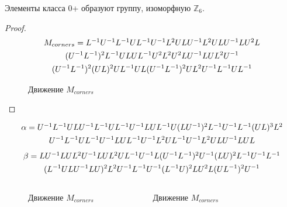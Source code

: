 \documentclass{beamer}
\begin{document}
\begin{frame}
	\begin{theorem}
		Элементы класса 0+ образуют группу, изоморфную $\mathbb{Z}_6$.	
	\end{theorem}
	\begin{proof}
		\vspace*{-7mm}
		\begin{multline*}
		$$
		M_{corners}=L^{-1}U^{-1}L^{-1}UL^{-1}U^{-1}L^2ULU^{-1}L^2ULU^{-1}LU^2L \\
		(U^{-1}L^{-1})^2L^{-1}ULUL^{-1}U^2L^2U^2LU^{-1}LUL^2U^{-1} \\
		(U^{-1}L^{-1})^2(UL)^2UL^{-1}UL(U^{-1}L^{-1})^2UL^2U^{-1}L^{-1}UL^{-1}
		$$
		\end{multline*}
		\RubikCubeSolved
		\vspace*{-1cm}
		\begin{figure}[c]
		\caption{Движение $M_{corners}$}
		\end{figure}
		\vspace*{-7mm}
		\end{proof}
\end{frame}

\begin{frame}
\begin{multline*} %
$$
\alpha=U^{-1}L^{-1}ULU^{-1}L^{-1}UL^{-1}U^{-1}LUL^{-1}U(LU^{-1})^2L^{-1}U^{-1}L^{-1}(UL)^3L^2 \\
U^{-1}L^{-1}UL^{-1}U^{-1}LUL^{-1}U^{-1}L^2UL^{-1}U^{-1}L^2ULU^{-1}LUL
$$
\end{multline*}
\begin{multline*} %
$$
\beta=LU^{-1}LUL^2U^{-1}LUL^2UL^{-1}U^{-1}L(U^{-1}L^{-1})^2U^{-1}(LU)^2L^{-1}U^{-1}L^{-1}\\ 
(L^{-1}ULU^{-1}LU)^2L^2U^{-1}L^{-1}U^{-1}(L^{-1}U)^2LU^2L(UL^{-1})^2U^{-1}
$$
\end{multline*}
\begin{columns}
	\RubikCubeSolved
	\vspace*{-1cm}
	\begin{figure}[c]
		\caption{Движение $M_{corners}$}
	\end{figure}
	\RubikCubeSolved
	\vspace*{-1cm}
	\begin{figure}[c]
		\caption{Движение $M_{corners}$}
	\end{figure}
\end{columns}
\end{frame}
\end{document}
